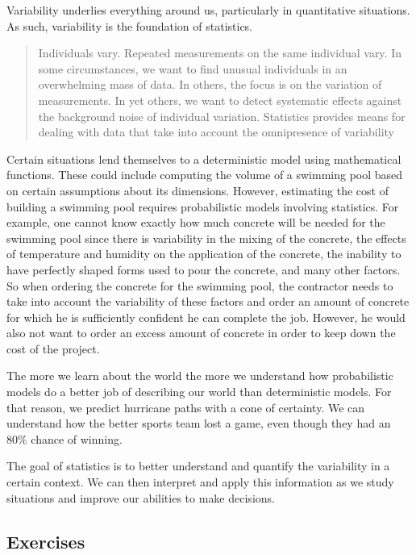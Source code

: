 \documentclass[
]{book}
\theoremstyle{definition}
\theoremstyle{definition}
\theoremstyle{definition}
\theoremstyle{definition}
\theoremstyle{remark}
\begin{document}
Variability underlies everything around us, particularly in quantitative situations. As such, variability is the foundation of statistics.

\begin{quote}
Individuals vary. Repeated measurements on the same individual vary. In some circumstances, we want to find unusual individuals in an overwhelming mass of data. In others, the focus is on the variation of measurements. In yet others, we want to detect systematic effects against the background noise of individual variation. Statistics provides means for dealing with data that take into account the omnipresence of variability \citep[p.~801]{Cobb1997}
\end{quote}

Certain situations lend themselves to a deterministic model using mathematical functions. These could include computing the volume of a swimming pool based on certain assumptions about its dimensions. However, estimating the cost of building a swimming pool requires probabilistic models involving statistics. For example, one cannot know exactly how much concrete will be needed for the swimming pool since there is variability in the mixing of the concrete, the effects of temperature and humidity on the application of the concrete, the inability to have perfectly shaped forms used to pour the concrete, and many other factors. So when ordering the concrete for the swimming pool, the contractor needs to take into account the variability of these factors and order an amount of concrete for which he is sufficiently confident he can complete the job. However, he would also not want to order an excess amount of concrete in order to keep down the cost of the project.

The more we learn about the world the more we understand how probabilistic models do a better job of describing our world than deterministic models. For that reason, we predict hurricane paths with a cone of certainty. We can understand how the better sports team lost a game, even though they had an 80\% chance of winning.

The goal of statistics is to better understand and quantify the variability in a certain context. We can then interpret and apply this information as we study situations and improve our abilities to make decisions.

\hypertarget{exercises-59}{%
\subsection{Exercises}\label{exercises-59}}
\end{document}
